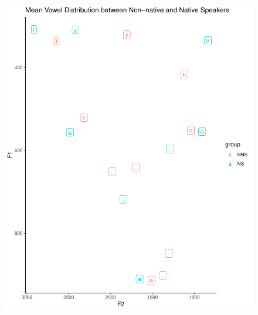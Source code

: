 \documentclass[man, fleqn, noextraspace]{apa6}
\begin{document}
\begin{figure}
\centering
\includegraphics{Vowel_v3_files/figure-latex/figure2-1.pdf}
\caption{}
\end{figure}
\end{document}
